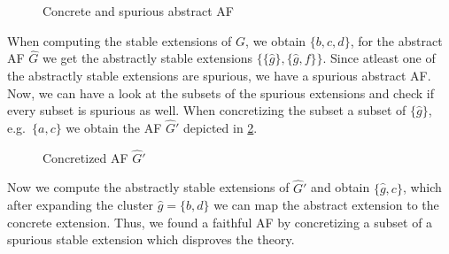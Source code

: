 \begin{example}
\begin{figure}[h]
\begin{minipage}{.5\textwidth}
\begin{tikzpicture}
    \end{tikzpicture}
    \label{af:implementationRefutedTheoryB}
\end{minipage}%
\caption{Concrete and spurious abstract AF}
\label{fig:ImplementationRefutedTheoryDefinition}
\end{figure}
\vspace{0.3cm}

When computing the stable extensions of $G$, we obtain $\bigl\{b, c, d\bigl\}$, for the abstract AF $\hat{G}$ we get the abstractly stable extensions $\bigl\{ \{\hat{g}\}, \{\hat{g}, f\}\bigl\}$. Since atleast one of the abstractly stable extensions are spurious, we have a spurious abstract AF. Now, we can have a look at the subsets of the spurious extensions and check if every subset is spurious as well. When concretizing the subset a subset of $\{\hat{g}\}$, e.g.\ $\{a, c\}$ we obtain the AF $\hat{G}'$ depicted in \cref{af:ImplementationRefutedTheoryDefinitionSpurious}.


\vspace{0.3cm}
\begin{figure}[h]
    \centering
\caption{Concretized AF $\hat{G}'$}
\label{af:ImplementationRefutedTheoryDefinitionSpurious}
\end{figure}
\vspace{0.3cm}

Now we compute the abstractly stable extensions of $\hat{G}'$ and obtain $\{\hat{g}, c\}$, which after expanding the cluster $\hat{g}=\{b, d\}$ we can map the abstract extension to the concrete extension. Thus, we found a faithful AF by concretizing a subset of a spurious stable extension which disproves the theory.

\end{example}
